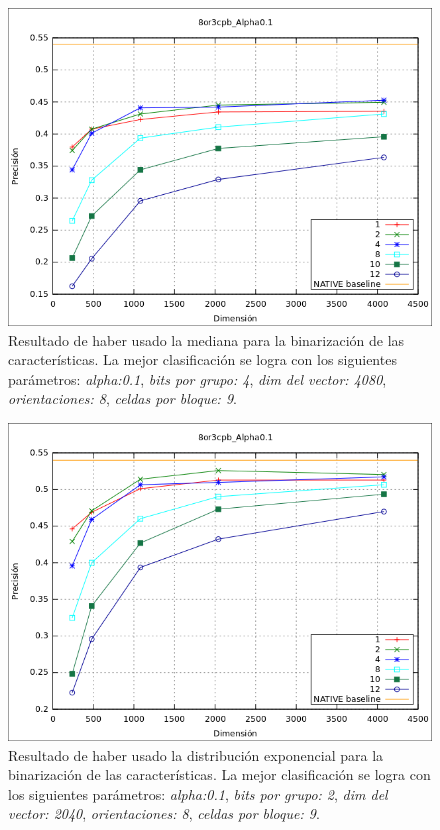 			\begin{figure}[htbp]
				\centering
				\includegraphics[scale=0.6]{img/resultados/reales/median.png}
				\caption[Reales con umbral mediana]{Resultado de haber usado la mediana para la binarización de las características. La mejor clasificación se logra con los siguientes parámetros: \textit{alpha:0.1}, \textit{bits por grupo: 4}, \textit{dim del vector: 4080}, \textit{orientaciones: 8}, \textit{celdas por bloque: 9}.}
				\label{fig: Reales-mediana}
			\end{figure}
			
			\begin{figure}[htbp]
				\centering
				\includegraphics[scale=0.6]{img/resultados/reales/expon.png}
				\caption[Reales con umbral exponencial]{Resultado de haber usado la distribución exponencial para la binarización de las características. La mejor clasificación se logra con los siguientes parámetros: \textit{alpha:0.1}, \textit{bits por grupo: 2}, \textit{dim del vector: 2040}, \textit{orientaciones: 8}, \textit{celdas por bloque: 9}.}
				\label{fig: Reales-expon}
			\end{figure}
			
